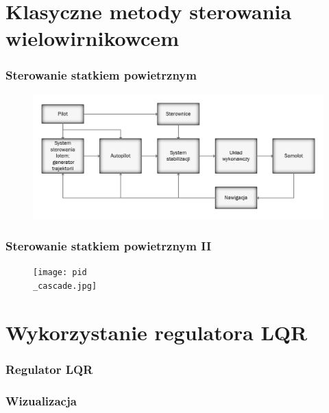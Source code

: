 \documentclass[aspectratio=169]{beamer}
\begin{document}
\section{Klasyczne metody sterowania wielowirnikowcem}

\begin{frame}
	\frametitle{Sterowanie statkiem powietrznym}
	\begin{figure}
	   		 \centering
	      		\includegraphics[width=\textwidth]{controller.png}
	\end{figure}
\end{frame}

\begin{frame}
	\frametitle{Sterowanie statkiem powietrznym II}
	\begin{figure}
	   		 \centering
	      		 \texttt{[image: pid\\\_cascade.jpg]}
	\end{figure}
\end{frame}


\section{Wykorzystanie regulatora LQR}

\begin{frame}
	\frametitle{Regulator LQR}
\end{frame}

\begin{frame}
	\frametitle{Wizualizacja}
	\href{https://jordan787878.github.io/firstweb/6dofQuadcopter/6dofQuad_LQR.html}{}
\end{frame}
\end{document}

